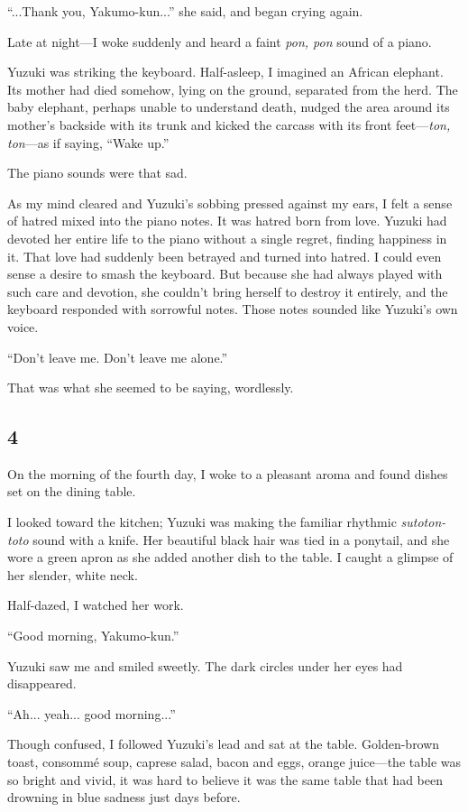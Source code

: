 \documentclass[
    a4paper,
    12pt,
    twoside,
    openany,
    UTF8,
    fontset=windows
]{ctexbook}
\begin{document}
``...Thank you, Yakumo-kun...'' she said, and began crying again.

Late at night---I woke suddenly and heard a faint \textit{pon, pon} sound of a piano.

Yuzuki was striking the keyboard. Half-asleep, I imagined an African elephant. Its mother had died somehow, lying on the ground, separated from the herd. The baby elephant, perhaps unable to understand death, nudged the area around its mother's backside with its trunk and kicked the carcass with its front feet---\textit{ton, ton}---as if saying, ``Wake up.''

The piano sounds were that sad.

As my mind cleared and Yuzuki's sobbing pressed against my ears, I felt a sense of hatred mixed into the piano notes. It was hatred born from love. Yuzuki had devoted her entire life to the piano without a single regret, finding happiness in it. That love had suddenly been betrayed and turned into hatred. I could even sense a desire to smash the keyboard. But because she had always played with such care and devotion, she couldn't bring herself to destroy it entirely, and the keyboard responded with sorrowful notes. Those notes sounded like Yuzuki's own voice.

``Don't leave me. Don't leave me alone.''

That was what she seemed to be saying, wordlessly.


\subsection*{4}

On the morning of the fourth day, I woke to a pleasant aroma and found dishes set on the dining table.

I looked toward the kitchen; Yuzuki was making the familiar rhythmic \textit{sutoton-toto} sound with a knife. Her beautiful black hair was tied in a ponytail, and she wore a green apron as she added another dish to the table. I caught a glimpse of her slender, white neck.

Half-dazed, I watched her work.

``Good morning, Yakumo-kun.''

Yuzuki saw me and smiled sweetly. The dark circles under her eyes had disappeared.

``Ah... yeah... good morning...''

Though confused, I followed Yuzuki's lead and sat at the table. Golden-brown toast, consommé soup, caprese salad, bacon and eggs, orange juice---the table was so bright and vivid, it was hard to believe it was the same table that had been drowning in blue sadness just days before.
\end{document}
